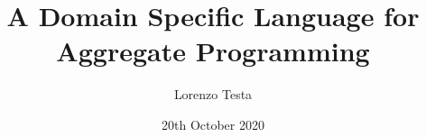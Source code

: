 \documentclass[a4paper,12pt]{extbook} %
\begin{document}
\title{A Domain Specific Language for Aggregate Programming}
\date{20th October 2020}
\author{Lorenzo Testa}

\newcommand*\sequence[1]{$\overline{#1}$}

\renewcommand\labelitemi{\raisebox{.1em}{\tiny$\bullet$}}
\end{document}
